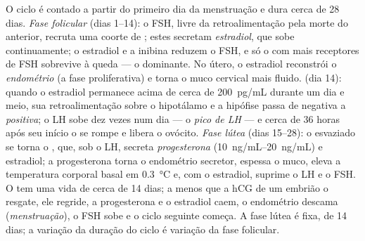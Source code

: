 \begin{definition}\label{def:b2:reproductive-hormones:cycle}
O ciclo é contado a partir do primeiro dia da menstruação e dura cerca
de 28 dias. \emph{Fase folicular} (dias 1--14): o FSH, livre da
retroalimentação pela morte do  anterior, recruta uma
coorte de ; estes secretam \emph{estradiol}, que sobe
continuamente; o estradiol e a inibina reduzem o FSH, e só o 
com mais receptores de FSH sobrevive à queda --- o  dominante.
No útero, o estradiol reconstrói o \emph{endométrio} (a fase
proliferativa) e torna o muco cervical mais fluido. \emph{}
(dia 14): quando o estradiol permanece acima de cerca de
\qty{200}{pg/mL} durante um dia e meio, sua retroalimentação sobre o
hipotálamo e a hipófise passa de negativa a \emph{positiva}; o LH sobe
dez vezes num dia --- o \emph{pico de LH} --- e cerca de 36 horas após
seu início o  se rompe e libera o ovócito. \emph{Fase lútea}
(dias 15--28): o  esvaziado se torna o , que, sob o
LH, secreta \emph{progesterona} (\qtyrange{10}{20}{ng/mL}) e estradiol;
a progesterona torna o endométrio secretor, espessa o muco, eleva a
temperatura corporal basal em \qty{0.3}{\celsius} e, com o estradiol,
suprime o LH e o FSH. O  tem uma vida de cerca de 14 dias;
a menos que a hCG de um embrião o resgate, ele regride, a progesterona
e o estradiol caem, o endométrio descama (\emph{menstruação}), o FSH
sobe e o ciclo seguinte começa. A fase lútea é fixa, de 14 dias; a
variação da duração do ciclo é variação da fase folicular.
\end{definition}

